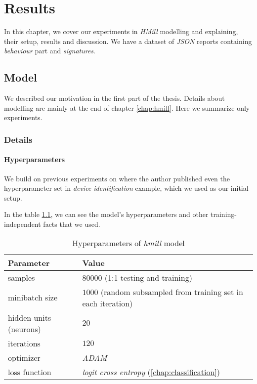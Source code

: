 \chapter{Results} \label{chap:results}
In this chapter, we cover our experiments in \emph{HMill} modelling and explaining, their setup, results and discussion. We have a dataset of \emph{JSON} reports containing \emph{behaviour} part and \emph{signatures}.

\section{Model}
We described our motivation in the first part of the thesis. Details about modelling are mainly at the end of chapter \ref{chap:hmill}. Here we summarize only experiments.

\subsection{Details}
\subsubsection{Hyperparameters}
We build on previous experiments on \cite{Mandlik2020} where the author published even the hyperparameter set in \emph{device identification} example, which we used as our initial setup.

In the table \ref{tab:hyperparams}, we can see the model's hyperparameters and other training-independent facts that we used.

\begin{table}[h]
  \centering
  \caption{Hyperparameters of \emph{hmill} model}
  \begin{tabular}{p{6cm}p{8cm}} 
      \toprule
      \textbf{Parameter} &
      \textbf{Value} \\
      \midrule
      samples & $80000$ (1:1 testing and training) \\
      \midrule
      minibatch size & $1000$ (random subsampled from training set in each iteration)\\
      \midrule
      hidden units (neurons)& $20$\\
      \midrule
      iterations & $120$\\
      \midrule
      optimizer & \emph{ADAM} \cite{Kingma2014}\\
      \midrule
      loss function & \emph{logit cross entropy} (\ref{chap:classification})\\
      \bottomrule
  \end{tabular}
  \label{tab:hyperparams}
\end{table}

